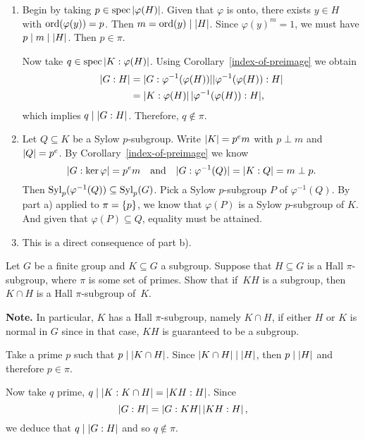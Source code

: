 \begin{solution}
\begin{enumerate}[\rm a)]
    \item Begin by taking $p\in\operatorname{spec}\left\vert{\varphi(H)}\right\vert$. Given that $\varphi$ is onto, there exists $y\in H$ with ${\rm ord}(\varphi(y))=p$. Then $m={\rm ord}(y)\mid\left\vert{H}\right\vert$. Since $\varphi(y)^m=1$, we must have $p\mid m\mid\left\vert{H}\right\vert$. Then $p\in\pi$.

    
    Now take $q\in\operatorname{spec}\left\vert{K:\varphi(H)}\right\vert$. Using Corollary~\ref{index-of-preimage} we obtain
    \begin{align*}
        \left\vert{G:H}\right\vert &=|G:\varphi^{-1}(\varphi(H))||\varphi^{-1}(\varphi(H)):H|\\
            &= \left\vert{K:\varphi(H)}\right\vert|\varphi^{-1}(\varphi(H)):H|,
    \end{align*}
    which implies $q\mid\left\vert{G:H}\right\vert$. Therefore, $q\notin\pi$.
    
    \item Let $Q\subseteq K$ be a Sylow $p$-subgroup. Write $\left\vert{K}\right\vert=p^em$ with $p\perp m$ and $\left\vert{Q}\right\vert=p^e$. By Corollary~\ref{index-of-preimage} we know
    $$
        |G:\ker\varphi|=p^em\quad{\rm and}\quad
            |G:\varphi^{-1}(Q)| = \left\vert{K:Q}\right\vert= m\perp p.
    $$
    Then ${\rm Syl}_p(\varphi^{-1}(Q))\subseteq{\rm Syl}_p(G)$. Pick a Sylow $p$-subgroup $P$ of $\varphi^{-1}(Q)$. By part a) applied to $\pi=\{p\}$, we know that $\varphi(P)$ is a Sylow $p$-subgroup of $K$. And given that $\varphi(P)\subseteq Q$, equality must be attained.
    
    \item This is a direct consequence of part b).
\end{enumerate}
\end{solution}

\begin{probl}\label{problem-1.B.6}
    Let $G$ be a finite group and\/ $K \subseteq G$ a subgroup. Suppose that\/ $H \subseteq G$ is a Hall\/ $\pi$-subgroup, where $\pi$ is some set of primes. Show that if\/~$KH$ is a subgroup, then $K \cap H$ is a Hall\/ $\pi$-subgroup of\/~$K$.

    \textrm{\rm\textbf{Note.} In particular, $K$ has a Hall $\pi$-subgroup, namely $K\cap H$, if either $H$ or $K$ is normal in $G$ since in that case, $KH$ is guaranteed to be a subgroup.}
\end{probl}

\begin{solution} Take a prime $p$ such that $p\mid\left\vert{K\cap H}\right\vert$. Since $\left\vert{K\cap H}\right\vert\mid\left\vert{H}\right\vert$, then $p\mid\left\vert{H}\right\vert$ and therefore $p\in\pi$.

Now take $q$ prime, $q\mid\left\vert{K:K\cap H}\right\vert=\left\vert{KH:H}\right\vert$. Since
$$
    \left\vert{G:H}\right\vert=\left\vert{G:KH}\right\vert\left\vert{KH:H}\right\vert,
$$
we deduce that $q\mid\left\vert{G:H}\right\vert$ and so $q\notin\pi$.  \end{solution}

